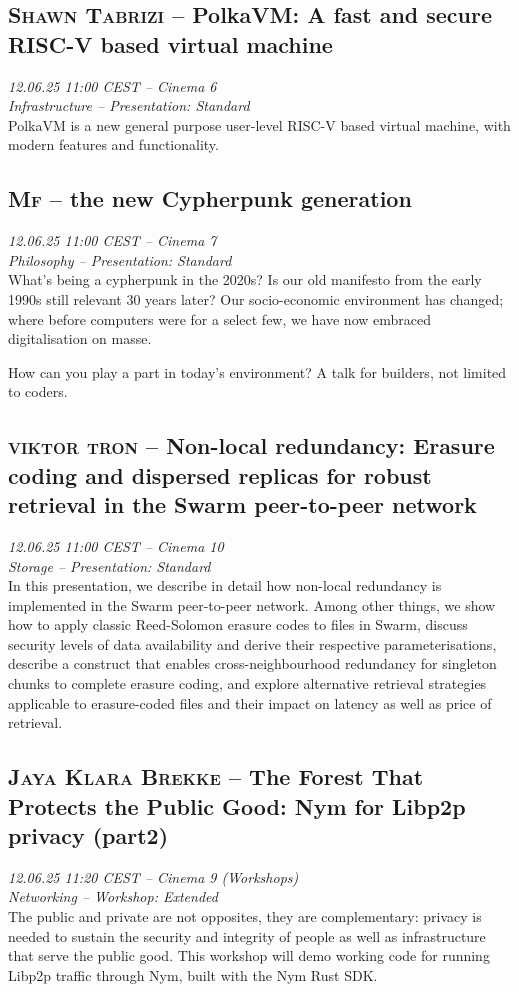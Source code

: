 \clearpage
\subsection {\textsc{Shawn Tabrizi}  -- PolkaVM: A fast and secure RISC-V based virtual machine} \noindent \textit {12.06.25 11:00 CEST -- Cinema 6\\ Infrastructure -- Presentation: Standard}\\[1em] PolkaVM is a new general purpose user-level RISC-V based virtual machine, with modern features and functionality.

\clearpage
\subsection {\textsc{Mf}  -- the new Cypherpunk generation} \noindent \textit {12.06.25 11:00 CEST -- Cinema 7\\ Philosophy -- Presentation: Standard}\\[1em] What's being a cypherpunk in the 2020s? Is our old manifesto from the early 1990s still relevant 30 years later? Our socio-economic environment has changed; where before computers were for a select few, we have now embraced digitalisation on masse.

How can you play a part in today's environment? A talk for builders, not limited to coders.

\clearpage
\subsection {\textsc{viktor tron}  -- Non-local redundancy: Erasure coding and dispersed replicas for robust retrieval in the Swarm peer-to-peer network} \noindent \textit {12.06.25 11:00 CEST -- Cinema 10\\ Storage -- Presentation: Standard}\\[1em] In this presentation, we describe in detail how non-local redundancy is implemented in the Swarm  peer-to-peer network. Among other things, we show how to apply classic Reed-Solomon erasure codes to files in Swarm, discuss security levels of data availability and derive their respective parameterisations, describe a construct that enables cross-neighbourhood redundancy for singleton chunks to complete erasure coding, and explore alternative retrieval strategies applicable to erasure-coded files and their impact on latency as well as price of retrieval.

\clearpage
\subsection {\textsc{Jaya Klara Brekke}  -- The Forest That Protects the Public Good: Nym for Libp2p privacy (part2)} \noindent \textit {12.06.25 11:20 CEST -- Cinema 9 (Workshops)\\ Networking -- Workshop: Extended}\\[1em] The public and private are not opposites, they are complementary: privacy is needed to sustain the security and integrity of people as well as infrastructure that serve the public good. This workshop will demo working code for running Libp2p traffic through Nym, built with the Nym Rust SDK.

